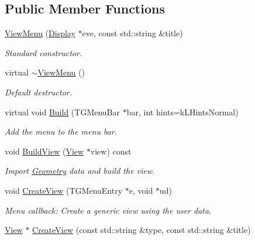 \subsection*{Public Member Functions}
\begin{DoxyCompactItemize}
\item 
\hyperlink{class_d_d4hep_1_1_view_menu_a94db1dcf6c0d83d0c31f03f3817f530f}{ViewMenu} (\hyperlink{class_d_d4hep_1_1_display}{Display} $\ast$eve, const std::string \&title)
\begin{DoxyCompactList}\small\item\em Standard constructor. \item\end{DoxyCompactList}\item 
virtual \hyperlink{class_d_d4hep_1_1_view_menu_ad36eb8eac44790e3b64f1cce2c048c28}{$\sim$ViewMenu} ()
\begin{DoxyCompactList}\small\item\em Default destructor. \item\end{DoxyCompactList}\item 
virtual void \hyperlink{class_d_d4hep_1_1_view_menu_abd9d63ee3f3ca7b16a646b29e41a855c}{Build} (TGMenuBar $\ast$bar, int hints=kLHintsNormal)
\begin{DoxyCompactList}\small\item\em Add the menu to the menu bar. \item\end{DoxyCompactList}\item 
void \hyperlink{class_d_d4hep_1_1_view_menu_a0f001eb726cf3afc4f48067b5c233569}{BuildView} (\hyperlink{class_d_d4hep_1_1_view}{View} $\ast$view) const 
\begin{DoxyCompactList}\small\item\em Import \hyperlink{namespace_d_d4hep_1_1_geometry}{Geometry} data and build the view. \item\end{DoxyCompactList}\item 
void \hyperlink{class_d_d4hep_1_1_view_menu_ad72d3a90a912cf08292c278a45701b93}{CreateView} (TGMenuEntry $\ast$e, void $\ast$ud)
\begin{DoxyCompactList}\small\item\em Menu callback: Create a generic view using the user data. \item\end{DoxyCompactList}\item 
\hyperlink{class_d_d4hep_1_1_view}{View} $\ast$ \hyperlink{class_d_d4hep_1_1_view_menu_a892a83a22a71cfaaed9dca2c8f5a3f67}{CreateView} (const std::string \&type, const std::string \&title)

\end{DoxyCompactItemize}
